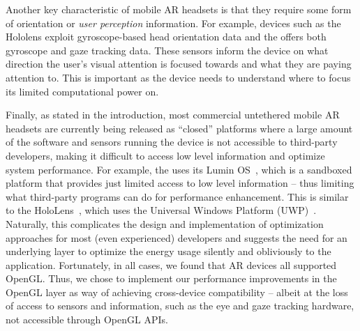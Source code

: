 Another key characteristic of mobile AR headsets is that they require 
some form of orientation or \emph{user perception} information. For example, devices such as the Hololens exploit gyroscope-based head orientation data and the {\mlo} offers both gyroscope and gaze tracking data. These sensors inform the device on what direction the user's visual attention is focused towards and what they are paying attention to. This is important as the device needs to understand where to focus its limited computational power on.

Finally, as stated in the introduction, most commercial untethered mobile AR headsets are currently being released as ``closed'' platforms where a large amount of the software and sensors running the device is not accessible to third-party developers, making it difficult to access low level information and optimize system performance.
%
For example, the {\mlo} uses its Lumin OS~\cite{XXX}, which is a sandboxed platform that provides just limited access to low level information -- thus limiting what third-party programs can do for performance enhancement. This is similar to the  HoloLens~\cite{hololens}, which uses the Universal Windows Platform (UWP)~\cite{uwp}. 
%
Naturally, this complicates the design and implementation of optimization
approaches for most (even experienced) developers and suggests 
the need for an underlying layer to optimize the energy usage
silently and obliviously to the application. Fortunately, in all cases, we found that AR devices all supported OpenGL. Thus, we chose to implement our performance improvements in the OpenGL layer as way of achieving cross-device compatibility -- albeit at the loss of access to sensors and information, such as the eye and gaze tracking hardware, not accessible through OpenGL APIs.








